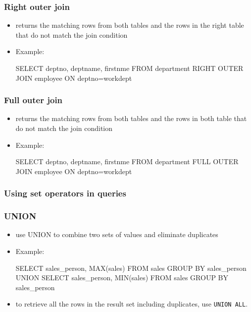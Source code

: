 \documentclass{article}
\begin{document}
\subsubsection*{Right outer join}
\begin{itemize}
\item returns the matching rows from both tables and the rows in the right
table that do not match the join condition
\item Example:
\begin{sqlcode}
SELECT deptno, deptname, firstnme FROM department RIGHT OUTER JOIN employee ON deptno=workdept
\end{sqlcode}
\end{itemize}

\subsubsection*{Full outer join}
\begin{itemize}
\item returns the matching rows from both tables and the rows in both
table that do not match the join condition
\item Example:
\begin{sqlcode}
SELECT deptno, deptname, firstnme FROM department FULL OUTER JOIN employee ON deptno=workdept
\end{sqlcode}
\end{itemize}

\subsubsection{Using set operators in queries}
\subsubsection*{UNION}
\begin{itemize}
\item use UNION to combine two sets of values and eliminate duplicates
\item Example:
\begin{sqlcode}
SELECT sales_person, MAX(sales) FROM sales GROUP BY sales_person
UNION
SELECT sales_person, MIN(sales) FROM sales GROUP BY sales_person
\end{sqlcode}
\item to retrieve all the rows in the result set including duplicates, use \texttt{UNION ALL}.
\end{itemize}
\end{document}
